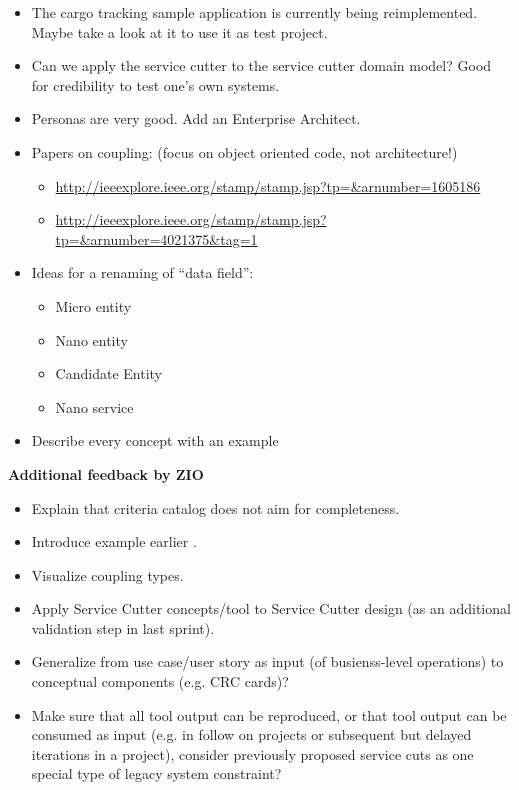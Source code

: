 \begin{itemize}
\item The cargo tracking sample application is currently being reimplemented. Maybe take a look at it to use it as test project.
\item Can we apply the service cutter to the service cutter domain model? Good for credibility to test one's own systems. 
\item Personas are very good. Add an Enterprise Architect.
\item Papers on coupling: (focus on object oriented code, not architecture!)
	\begin{itemize}
		\item \url{http://ieeexplore.ieee.org/stamp/stamp.jsp?tp=\&arnumber=1605186}
		\item \url{http://ieeexplore.ieee.org/stamp/stamp.jsp?tp=\&arnumber=4021375\&tag=1}
	\end{itemize}
\item Ideas for a renaming of \enquote{data field}:
	\begin{itemize}
		\item Micro entity
		\item Nano entity
		\item Candidate Entity
		\item Nano service
	\end{itemize}
\item Describe every concept with an example
\end{itemize}

\textbf{Additional feedback by ZIO}
\begin{itemize}
\item Explain that criteria catalog does not aim for completeness.
\item Introduce example earlier .
\item Visualize coupling types.
\item Apply Service Cutter concepts/tool to Service Cutter design (as an additional validation step in last sprint).
\item Generalize from use case/user story as input (of busienss-level operations) to conceptual components (e.g. CRC cards)?
\item Make sure that all tool output can be reproduced, or that tool output can be consumed as input (e.g. in follow on projects or subsequent but delayed iterations in a project), consider previously proposed service cuts as one special type of legacy system constraint?
\end{itemize}

